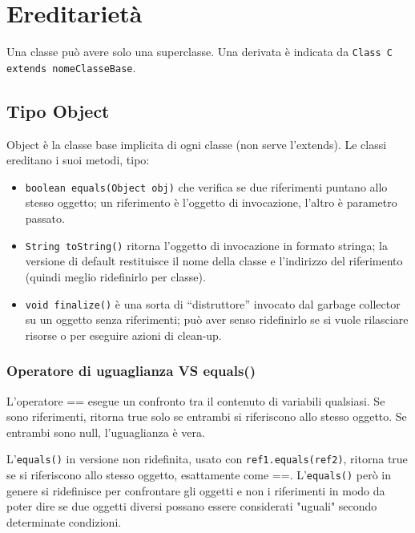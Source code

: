 \chapter{Ereditarietà}

Una classe può avere solo una superclasse. Una derivata è indicata da \texttt{Class C extends nomeClasseBase{}}. 

\section{Tipo Object} %
Object è la classe base implicita di ogni classe (non serve l'extends). Le classi ereditano i suoi metodi, tipo:
\begin{itemize}
\item \texttt{boolean equals(Object obj)} che verifica se due riferimenti puntano allo stesso oggetto; un riferimento è l'oggetto di invocazione, l'altro è parametro passato. 
\item \texttt{String toString()} ritorna l'oggetto di invocazione in formato stringa; la versione di default restituisce il nome della classe e l'indirizzo del riferimento (quindi meglio ridefinirlo per classe).
\item \texttt{void finalize()} è una sorta di “distruttore” invocato dal garbage collector su un oggetto senza riferimenti; può aver senso ridefinirlo se si vuole rilasciare risorse o per eseguire azioni di clean-up.
\end{itemize}

\subsection{Operatore di uguaglianza VS equals()} %
L'operatore == esegue un confronto tra il contenuto di variabili qualsiasi. Se sono riferimenti, ritorna true solo se entrambi si riferiscono allo stesso oggetto. Se entrambi sono null, l'uguaglianza è vera.

L'\texttt{equals()} in versione non ridefinita, usato con \texttt{ref1.equals(ref2)}, ritorna true se si riferiscono allo stesso oggetto, esattamente come ==. L'\texttt{equals()} però in genere si ridefinisce per confrontare gli oggetti e non i riferimenti in modo da poter dire se due oggetti diversi possano essere considerati "uguali" secondo determinate condizioni.

